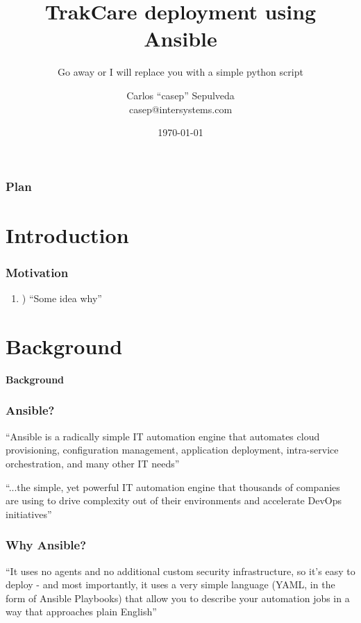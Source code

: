 \documentclass[12pt,landscape]{beamer}
\author{Carlos ``casep'' Sepulveda \\ casep@intersystems.com}
\date{\today}
\title{TrakCare deployment using Ansible}
\subtitle{Go away or I will replace you with a simple python script}
\newcounter{MyCounter}
\begin{document}
\begin{frame}
  \titlepage
\end{frame}

\begin{frame}
  \frametitle{Plan}
  \tableofcontents
\end{frame}

\section{Introduction}
\begin{frame}
  \frametitle{Motivation}

 \setcounter{MyCounter}{0}
 \begin{enumerate}[label={\arabic{MyCounter}\addtocounter{MyCounter}{1}}]
  \item) ``Some idea why''
 \end{enumerate}

\end{frame}

\section{Background}

\begin{frame}
 \textbf{Background}
\end{frame}

\begin{frame}
  \frametitle{Ansible?}
  
  ``Ansible is a radically simple IT automation engine that automates cloud provisioning, configuration management, application deployment, intra-service orchestration, and many other IT needs''\cite{ansible2}

  ``...the simple, yet powerful IT automation engine that thousands of companies are using to drive complexity out of their environments and accelerate DevOps initiatives''\cite{ansible}
          
\end{frame}

\begin{frame}
  \frametitle{Why Ansible?}
  
  ``It uses no agents and no additional custom security infrastructure, so it's easy to deploy - and most importantly, it uses a very simple language (YAML, in the form of Ansible Playbooks) that allow you to describe your automation jobs in a way that approaches plain English''\cite{ansible2}
          
\end{frame}
\end{document}

